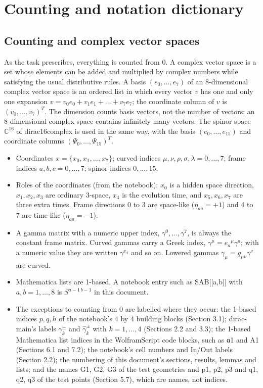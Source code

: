 \documentclass[11pt]{article}
\begin{document}
\section{Counting and notation dictionary}

\subsection{Counting and complex vector spaces}

As the task prescribes, everything is counted from 0. A complex vector space is a set whose elements can be added and multiplied by complex numbers while satisfying the usual distributive rules. A basis $(e_0,\dots,e_7)$ of an 8-dimensional complex vector space is an ordered list in which every vector $v$ has one and only one expansion $v=v_0e_0+v_1e_1+\dots+v_7e_7$; the coordinate column of $v$ is $(v_0,\dots,v_7)^T$. The dimension counts basis vectors, not the number of vectors: an 8-dimensional complex space contains infinitely many vectors. The spinor space $\mathbb C^{16}$ of dirac16complex is used in the same way, with the basis $(e_0,\dots,e_{15})$ and coordinate columns $(\Psi_0,\dots,\Psi_{15})^T$.

\begin{itemize}
\item Coordinates $x=\{x_0,x_1,\dots,x_7\}$; curved indices $\mu,\nu,\rho,\sigma,\lambda=0,\dots,7$; frame indices $a,b,c=0,\dots,7$; spinor indices $0,\dots,15$.
\item Roles of the coordinates (from the notebook): $x_0$ is a hidden space direction, $x_1,x_2,x_3$ are ordinary 3-space, $x_4$ is the evolution time, and $x_5,x_6,x_7$ are three extra times. Frame directions 0 to 3 are space-like ($\eta_{aa}=+1$) and 4 to 7 are time-like ($\eta_{aa}=-1$).
\item A gamma matrix with a numeric upper index, $\gamma^0,\dots,\gamma^7$, is always the constant frame matrix. Curved gammas carry a Greek index, $\gamma^\mu=e_a{}^\mu\gamma^a$; with a numeric value they are written $\gamma^{x_4}$ and so on. Lowered gammas $\gamma_\mu=g_{\mu\nu}\gamma^\nu$ are curved.
\item Mathematica lists are 1-based. A notebook entry such as SAB[[a,b]] with $a,b=1,\dots,8$ is $S^{a-1\,b-1}$ in this document.
\item The exceptions to counting from 0 are labelled where they occur: the 1-based indices $p,q,h$ of the notebook's 4 by 4 building blocks (Section 3.1); dirac-main's labels $\gamma_k^\pm$ and $\hat\gamma_k^\pm$ with $k=1,\dots,4$ (Sections 2.2 and 3.3); the 1-based Mathematica list indices in the WolframScript code blocks, such as α1 and A1 (Sections 6.1 and 7.2); the notebook's cell numbers and In/Out labels (Section 2.2); the numbering of this document's sections, results, lemmas and lists; and the names G1, G2, G3 of the test geometries and p1, p2, p3 and q1, q2, q3 of the test points (Section 5.7), which are names, not indices.
\end{itemize}
\end{document}
